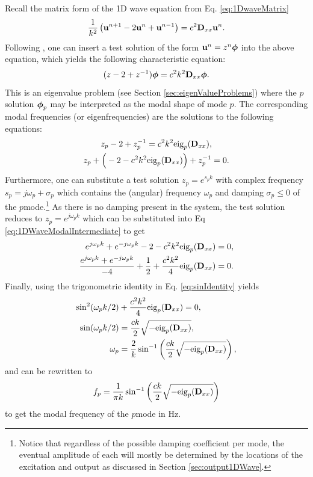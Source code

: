 {{{{Recall the matrix form of the 1D wave equation from Eq. \eqref{eq:1DwaveMatrix}
\begin{equation*}
    \frac{1}{k^2}\left(\mathbf{u}^{n+1}-2\mathbf{u}^n+\mathbf{u}^{n-1}\right) = c^2 \mathbf{D}_{xx}\mathbf{u}^n.
\end{equation*}
Following \cite{theBible}, one can insert a test solution of the form $\mathbf{u}^n = z^n\boldsymbol{\phi}$ into the above equation, which yields the following characteristic equation:
\begin{equation}
    (z - 2 + z^{-1})\boldsymbol{\phi} = c^2k^2\mathbf{D}_{xx} \boldsymbol{\phi}.
\end{equation}
This is an eigenvalue problem (see Section \ref{sec:eigenValueProblems}) where the $p$\th solution $\boldsymbol{\phi}_p$ may be interpreted as the modal shape of mode $p$. The corresponding modal frequencies (or eigenfrequencies) are the solutions to the following equations:
\begin{gather}\label{eq:1DWaveModalIntermediate}
    z_p-2+z_p^{-1} = c^2k^2\text{eig}_p(\mathbf{D}_{xx}),\nonumber\\
    z_p+\Big(-2-c^2k^2\text{eig}_p(\mathbf{D}_{xx})\Big)+z_p^{-1}=0.
\end{gather}
Furthermore, one can substitute a test solution $z_p = e^{s_pk}$ with complex frequency $s_p = j\omega_p + \sigma_p$ which contains the (angular) frequency $\omega_p$ and damping $\sigma_p \leq 0$ of the $p$\th mode.\footnote{Notice that regardless of the possible damping coefficient per mode, the eventual amplitude of each will mostly be determined by the locations of the excitation and output as discussed in Section \ref{sec:output1DWave}.} As there is no damping present in the system, the test solution reduces to $z_p = e^{j\omega_p k}$ which can be substituted into Eq \eqref{eq:1DWaveModalIntermediate} to get
\begin{align*}
    e^{j\omega_pk}+e^{-j\omega_pk}-2-c^2k^2\text{eig}_p(\mathbf{D}_{xx})&=0,\\
    \frac{e^{j\omega_pk}+e^{-j\omega_pk}}{-4}+\frac{1}{2}+\frac{c^2k^2}{4}\text{eig}_p(\mathbf{D}_{xx})&=0.
\end{align*}
Finally, using the trigonometric identity in Eq. \eqref{eq:sinIdentity} yields
\begin{align}
    \sin^2(\omega_pk/2)&+\frac{c^2k^2}{4}\text{eig}_p(\mathbf{D}_{xx})=0,\nonumber\\
    \sin(\omega_pk/2)&=\frac{ck}{2}\sqrt{-\text{eig}_p(\mathbf{D}_{xx})},\nonumber\\
    \omega_p &= \frac{2}{k}\sin^{-1}\left(\frac{ck}{2}\sqrt{-\text{eig}_p(\mathbf{D}_{xx})}\right),\label{eq:1DWaveModesAngular}
\end{align}
and can be rewritten to 
\begin{equation}
    f_p = \frac{1}{\pi k}\sin^{-1}\left(\frac{ck}{2}\sqrt{-\text{eig}_p(\mathbf{D}_{xx})}\right)\label{eq:1DWaveModes}
\end{equation}
to get the modal frequency of the $p$\th mode in Hz. 

}}}}
